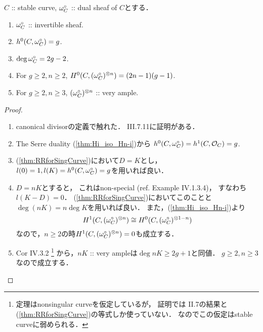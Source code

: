 \documentclass[a4paper]{jsarticle}
\begin{document}
    \begin{Prop}
        $C$ :: stable curve, $\omega^{\circ}_C$ :: dual sheaf of $C$とする．
        \begin{enumerate}[label=(\roman*), leftmargin=*]
            \item $\omega^{\circ}_C$ :: invertible sheaf.
            \item $h^0(C, \omega^{\circ}_C)=g$.
            \item $\deg \omega^{\circ}_C=2g-2$.
            \item For $g \geq 2, n \geq 2$, $H^0(C, (\omega^{\circ}_C)^{\otimes n})=(2n-1)(g-1)$.
            \item For $g \geq 2, n \geq 3$, $(\omega^{\circ}_C)^{\otimes n}$ :: very ample.
        \end{enumerate}
    \end{Prop}
    \begin{proof}
        \begin{enumerate}[label=(\roman*), leftmargin=*]
        \item
        canonical divisorの定義で触れた．
        \cite{HarAG} III.7.11に証明がある．

        \item
        The Serre duality (\ref{thm:Hi_iso_Hn-i})から
        $h^0(C, \omega^{\circ}_C)=h^1(C, \mathcal{O}_C)=g$.

        \item
        (\ref{thm:RRforSingCurve})において$D=K$とし，
        $l(0)=1, l(K)=h^0(C, \omega^{\circ}_C)=g$を用いれば良い．

        \item
        $D=nK$とすると，
        これはnon-special (ref. \cite{HarAG} Example IV.1.3.4)，
        すなわち$l(K-D)=0$．
        (\ref{thm:RRforSingCurve})においてこのことと$\deg (nK)=n \deg K$を用いれば良い．
        また，(\ref{thm:Hi_iso_Hn-i})より
        \[ H^1(C, (\omega^{\circ}_C)^{\otimes n}) \cong H^0(C, (\omega^{\circ}_C)^{\otimes 1-n}) \]
        なので，$n \geq 2$の時$H^1(C, (\omega^{\circ}_C)^{\otimes n})=0$も成立する．

        \item
        \cite{HarAG} Cor IV.3.2
        \footnote
        {
            定理はnonsingular curveを仮定しているが，
            証明では\cite{HarAG} II.7の結果と(\ref{thm:RRforSingCurve})の等式しか使っていない．
            なのでこの仮定はstable curveに弱められる．
        }
        から，$nK$ :: very ampleは$\deg nK \geq 2g+1$と同値．
        $g \geq 2, n \geq 3$なので成立する．
        \end{enumerate}
    \end{proof}
\end{document}
